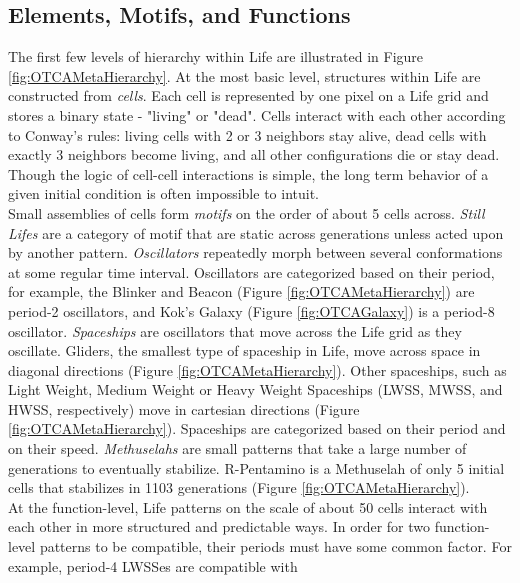 {\subsection{Elements, Motifs, and Functions}

The first few levels of hierarchy within Life are illustrated in Figure \ref{fig:OTCAMetaHierarchy}.  At the most basic level, structures within Life are constructed from \textit{cells}.  Each cell is represented by one pixel on a Life grid and stores a binary state - "living" or "dead".  Cells interact with each other according to Conway's rules: living cells with 2 or 3 neighbors stay alive, dead cells with exactly 3 neighbors become living, and all other configurations die or stay dead.  Though the logic of cell-cell interactions is simple, the long term behavior of a given initial condition is often impossible to intuit. \\

Small assemblies of cells form \textit{motifs} on the order of about 5 cells across.  \textit{Still Lifes} are a category of motif that are static across generations unless acted upon by another pattern.  \textit{Oscillators} repeatedly morph between several conformations at some regular time interval.  Oscillators are categorized based on their period, for example, the Blinker and Beacon (Figure \ref{fig:OTCAMetaHierarchy}) are period-2 oscillators, and Kok's Galaxy (Figure \ref{fig:OTCAGalaxy}) is a period-8 oscillator.  \textit{Spaceships} are oscillators that move across the Life grid as they oscillate.  Gliders, the smallest type of spaceship in Life, move across space in diagonal directions (Figure \ref{fig:OTCAMetaHierarchy}).  Other spaceships, such as Light Weight, Medium Weight or Heavy Weight Spaceships (LWSS, MWSS, and HWSS, respectively) move in cartesian directions (Figure \ref{fig:OTCAMetaHierarchy}).  Spaceships are categorized based on their period and on their speed.  \textit{Methuselahs} are small patterns that take a large number of generations to eventually stabilize.  R-Pentamino is a Methuselah of only 5 initial cells that stabilizes in 1103 generations (Figure \ref{fig:OTCAMetaHierarchy}).\\

At the function-level, Life patterns on the scale of about 50 cells interact with each other in more structured and predictable ways.  In order for two function-level patterns to be compatible, their periods must have some common factor.  For example, period-4 LWSSes are compatible with 

}
